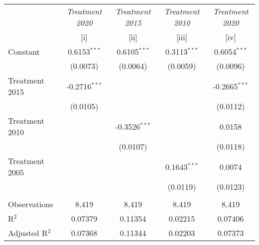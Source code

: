 
\begingroup
\centering
\begin{tabular}{lcccc}
   \toprule
                   & \textit{Treatment 2020}  & \textit{Treatment 2015}  & \textit{Treatment  2010}  & \textit{Treatment 2020}\\   
                   & [i]                      & [ii]                     & [iii]                     & [iv]\\  
   \midrule 
   Constant        & 0.6153$^{***}$           & 0.6105$^{***}$           & 0.3113$^{***}$            & 0.6054$^{***}$\\   
                   & (0.0073)                 & (0.0064)                 & (0.0059)                  & (0.0096)\\   
   Treatment 2015  & -0.2716$^{***}$          &                          &                           & -0.2665$^{***}$\\   
                   & (0.0105)                 &                          &                           & (0.0112)\\   
   Treatment  2010 &                          & -0.3526$^{***}$          &                           & 0.0158\\   
                   &                          & (0.0107)                 &                           & (0.0118)\\   
   Treatment 2005  &                          &                          & 0.1643$^{***}$            & 0.0074\\   
                   &                          &                          & (0.0119)                  & (0.0123)\\   
    \\
   Observations    & 8,419                    & 8,419                    & 8,419                     & 8,419\\  
   R$^2$           & 0.07379                  & 0.11354                  & 0.02215                   & 0.07406\\  
   Adjusted R$^2$  & 0.07368                  & 0.11344                  & 0.02203                   & 0.07373\\  
   \bottomrule
\end{tabular}
\par\endgroup


